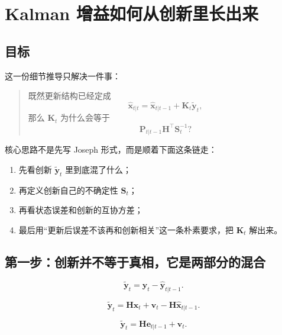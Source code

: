 \section{Kalman 增益如何从创新里长出来}\label{app:kalman-gain}

\subsection{目标}

这一份细节推导只解决一件事：

\begin{quote}
既然更新结构已经定成
\[
\hat{\bm{x}}_{t|t}
= \hat{\bm{x}}_{t|t-1} + \bm{K}_t\tilde{\bm{y}}_t,
\]
那么
\(\bm{K}_t\)
为什么会等于
\[
\bm{P}_{t|t-1}\bm{H}^\top\bm{S}_t^{-1}?
\]
\end{quote}

核心思路不是先写 Joseph 形式，而是顺着下面这条链走：
\begin{enumerate}
  \item 先看创新
  \(\tilde{\bm{y}}_t\)
  里到底混了什么；
  \item 再定义创新自己的不确定性
  \(\bm{S}_t\)；
  \item 再看状态误差和创新的互协方差；
  \item 最后用“更新后误差不该再和创新相关”这一条朴素要求，把
  \(\bm{K}_t\)
  解出来。
\end{enumerate}

\subsection{第一步：创新并不等于真相，它是两部分的混合}


\[
\tilde{\bm{y}}_t
= \bm{y}_t - \hat{\bm{y}}_{t|t-1}.
\]


\[
\tilde{\bm{y}}_t
= \bm{H}\bm{x}_t + \bm{v}_t - \bm{H}\hat{\bm{x}}_{t|t-1}.
\]


\[
\tilde{\bm{y}}_t
= \bm{H}\bm{e}_{t|t-1} + \bm{v}_t.
\]



